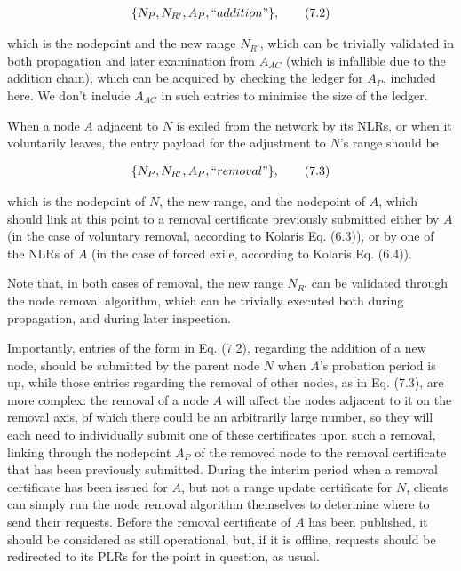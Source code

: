 \documentclass{extreport}
\begin{document}
\begin{align*}
\{ N_P, N_{R'}, A_P, ``addition\textrm{''} \}, \tag{7.2}
\end{align*}

which is the nodepoint and the new range \(N_{R'}\), which can be trivially validated in both propagation and later examination from \(A_{AC}\) (which is infallible due to the addition chain), which can be acquired by checking the ledger for \(A_P\), included here. We don't include \(A_{AC}\) in such entries to minimise the size of the ledger.

When a node \(A\) adjacent to \(N\) is exiled from the network by its NLRs, or when it voluntarily leaves, the entry payload for the adjustment to \(N\)'s range should be

\begin{align*}
\{ N_P, N_{R'}, A_P, ``removal\textrm{''} \}, \tag{7.3}
\end{align*}

which is the nodepoint of \(N\), the new range, and the nodepoint of \(A\), which should link at this point to a removal certificate previously submitted either by \(A\) (in the case of voluntary removal, according to Kolaris Eq. (6.3)), or by one of the NLRs of \(A\) (in the case of forced exile, according to Kolaris Eq. (6.4)).

Note that, in both cases of removal, the new range \(N_{R'}\) can be validated through the node removal algorithm, which can be trivially executed both during propagation, and during later inspection.

Importantly, entries of the form in Eq. (7.2), regarding the addition of a new node, should be submitted by the parent node \(N\) when \(A\)'s probation period is up, while those entries regarding the removal of other nodes, as in Eq. (7.3), are more complex: the removal of a node \(A\) will affect the nodes adjacent to it on the removal axis, of which there could be an arbitrarily large number, so they will each need to individually submit one of these certificates upon such a removal, linking through the nodepoint \(A_P\) of the removed node to the removal certificate that has been previously submitted. During the interim period when a removal certificate has been issued for \(A\), but not a range update certificate for \(N\), clients can simply run the node removal algorithm themselves to determine where to send their requests. Before the removal certificate of \(A\) has been published, it should be considered as still operational, but, if it is offline, requests should be redirected to its PLRs for the point in question, as usual.
\end{document}
